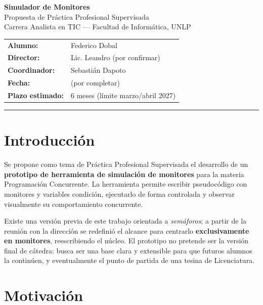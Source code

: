 \documentclass[11pt,a4paper]{article}
\begin{document}
\begin{center}
    {\Large\bfseries\color{unlpblue} Simulador de Monitores}\\[0.3em]
    {\large Propuesta de Práctica Profesional Supervisada}\\[0.6em]
    {\normalsize Carrera Analista en TIC --- Facultad de Informática, UNLP}
\end{center}

\vspace{0.8em}

\begin{tabular}{ll}
    \textbf{Alumno:} & Federico Dobal \\
    \textbf{Director:} & Lic. Leandro (por confirmar) \\
    \textbf{Coordinador:} & Sebastián Dapoto \\
    \textbf{Fecha:} & (por completar) \\
    \textbf{Plazo estimado:} & 6 meses (límite marzo/abril 2027) \\
\end{tabular}

\vspace{1em}
\hrule
\vspace{1em}

\section{Introducción}

Se propone como tema de Práctica Profesional Supervisada el desarrollo de un
\textbf{prototipo de herramienta de simulación de monitores} para la materia Programación
Concurrente. La herramienta permite escribir pseudocódigo con monitores y variables
condición, ejecutarlo de forma controlada y observar visualmente su comportamiento
concurrente.

Existe una versión previa de este trabajo orientada a \emph{semáforos}; a partir de la
reunión con la dirección se redefinió el alcance para centrarlo \textbf{exclusivamente en
monitores}, reescribiendo el núcleo. El prototipo no pretende ser la versión final de
cátedra: busca ser una base clara y extensible para que futuros alumnos la continúen, y
eventualmente el punto de partida de una tesina de Licenciatura.

\section{Motivación}
\end{document}
